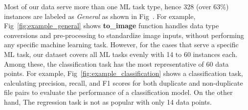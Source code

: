 



%
%

Most of our data serve more than one ML task type, hence 328 (over 63\%) instances are labeled as \textit{General} as shown in Fig~. For example, Fig~\ref{fig:example_general} shows \textbf{to\_image} function handles data type conversions and pre-processing to standardize image inputs, without performing any specific machine learning task. However, for the cases that serve a specific ML task, our dataset covers all ML tasks evenly with 14 to 60 instances each. Among these, the classification task has the most representative of 60 data points. For example, Fig~\ref{fig:example_classification} shows a classification task, calculating precision, recall, and F1 scores for both duplicate and non-duplicate file pairs to evaluate the performance of a classification model. On the other hand, The regression task is not as popular with only 14 data points.



